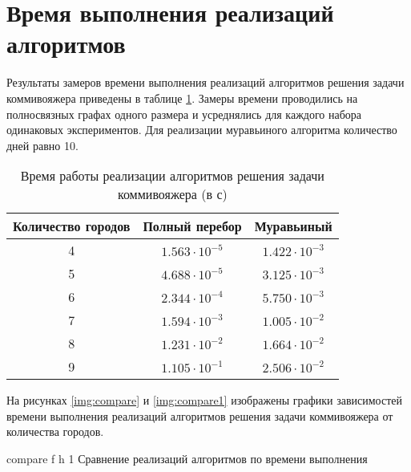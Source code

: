 \section{Время выполнения реализаций алгоритмов}

Результаты замеров времени выполнения реализаций алгоритмов решения задачи коммивояжера приведены в таблице \ref{tbl:time_measurements}.
Замеры времени проводились на полносвязных графах одного размера и усреднялись для каждого набора одинаковых экспериментов. Для реализации муравьиного алгоритма количество дней равно 10.

\begin{table}[h]
	\begin{center}
		\begin{threeparttable}
			\captionsetup{justification=raggedright,singlelinecheck=off}
			\caption{Время работы реализации алгоритмов решения задачи коммивояжера (в с)}
			\label{tbl:time_measurements}
			\begin{tabular}{|c|c|c|}
				\hline
				Количество городов &  Полный перебор  & Муравьиный \\
				\hline
				4 &$ 1.563\cdot10^{-5} $&$ 1.422\cdot10^{-3}$\\
				\hline
				5 &$ 4.688\cdot10^{-5} $&$ 3.125\cdot10^{-3}$\\
				\hline
				6 &$ 2.344\cdot10^{-4} $&$ 5.750\cdot10^{-3}$\\
				\hline
				7 &$ 1.594\cdot10^{-3} $&$ 1.005\cdot10^{-2}$\\
				\hline
				8 &$ 1.231\cdot10^{-2} $&$ 1.664\cdot10^{-2}$\\
				\hline
				9 &$ 1.105\cdot10^{-1} $&$ 2.506\cdot10^{-2}$\\
				\hline
			\end{tabular}
		\end{threeparttable}
	\end{center}
\end{table}

\clearpage
На рисунках \ref{img:compare} и \ref{img:compare1} изображены графики зависимостей времени выполнения реализаций алгоритмов решения задачи коммивояжера от количества городов.

{compare} %
{f} %
{h} %
{1\textwidth} %
{Сравнение реализаций алгоритмов по времени выполнения} %

